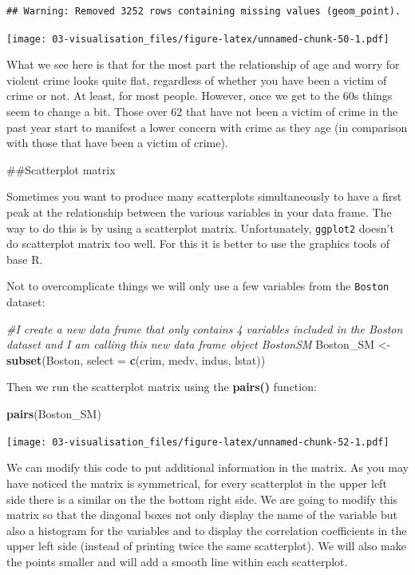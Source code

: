 \documentclass[]{book}
\newenvironment{Shaded}{\begin{snugshade}}{\end{snugshade}}
\newcommand{\CommentTok}[1]{\textcolor[rgb]{0.56,0.35,0.01}{\textit{#1}}}
\newcommand{\DataTypeTok}[1]{\textcolor[rgb]{0.13,0.29,0.53}{#1}}
\newcommand{\KeywordTok}[1]{\textcolor[rgb]{0.13,0.29,0.53}{\textbf{#1}}}
\newcommand{\NormalTok}[1]{#1}
\newcommand{\StringTok}[1]{\textcolor[rgb]{0.31,0.60,0.02}{#1}}
\theoremstyle{definition}
\theoremstyle{definition}
\theoremstyle{definition}
\theoremstyle{remark}
\begin{document}
\begin{verbatim}
## Warning: Removed 3252 rows containing missing values (geom_point).
\end{verbatim}

\texttt{[image: 03-visualisation\_files/figure-latex/unnamed-chunk-50-1.pdf]}

What we see here is that for the most part the relationship of age and
worry for violent crime looks quite flat, regardless of whether you have
been a victim of crime or not. At least, for most people. However, once
we get to the 60s things seem to change a bit. Those over 62 that have
not been a victim of crime in the past year start to manifest a lower
concern with crime as they age (in comparison with those that have been
a victim of crime).

\#\#Scatterplot matrix

Sometimes you want to produce many scatterplots simultaneously to have a
first peak at the relationship between the various variables in your
data frame. The way to do this is by using a scatterplot matrix.
Unfortunately, \texttt{ggplot2} doesn't do scatterplot matrix too well.
For this it is better to use the graphics tools of base R.

Not to overcomplicate things we will only use a few variables from the
\texttt{Boston} dataset:

\begin{Shaded}
\begin{Highlighting}[]
\CommentTok{#I create a new data frame that only contains 4 variables included in the Boston dataset and I am calling this new data frame object BostonSM}
\NormalTok{Boston_SM <-}\StringTok{ }\KeywordTok{subset}\NormalTok{(Boston, }\DataTypeTok{select =} \KeywordTok{c}\NormalTok{(crim, medv, indus, lstat))}
\end{Highlighting}
\end{Shaded}

Then we run the scatterplot matrix using the \textbf{pairs()} function:

\begin{Shaded}
\begin{Highlighting}[]
\KeywordTok{pairs}\NormalTok{(Boston_SM)}
\end{Highlighting}
\end{Shaded}

\texttt{[image: 03-visualisation\_files/figure-latex/unnamed-chunk-52-1.pdf]}

We can modify this code to put additional information in the matrix. As
you may have noticed the matrix is symmetrical, for every scatterplot in
the upper left side there is a similar on the the bottom right side. We
are going to modify this matrix so that the diagonal boxes not only
display the name of the variable but also a histogram for the variables
and to display the correlation coefficients in the upper left side
(instead of printing twice the same scatterplot). We will also make the
points smaller and will add a smooth line within each scatterplot.
\end{document}
